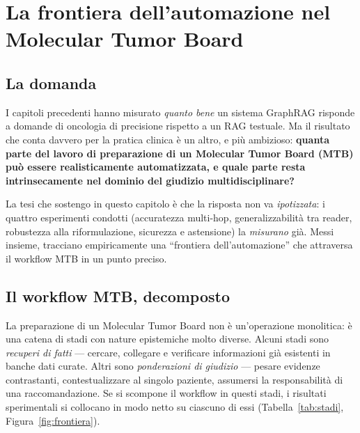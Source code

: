 \documentclass[11pt,a4paper]{report}
\begin{document}
\chapter{La frontiera dell'automazione nel Molecular Tumor Board}
\label{ch:frontiera-automazione}

\section{La domanda}

I capitoli precedenti hanno misurato \emph{quanto bene} un sistema GraphRAG
risponde a domande di oncologia di precisione rispetto a un RAG testuale. Ma
il risultato che conta davvero per la pratica clinica è un altro, e più
ambizioso: \textbf{quanta parte del lavoro di preparazione di un Molecular
Tumor Board (MTB) può essere realisticamente automatizzata, e quale parte
resta intrinsecamente nel dominio del giudizio multidisciplinare?}

La tesi che sostengo in questo capitolo è che la risposta non va
\emph{ipotizzata}: i quattro esperimenti condotti (accuratezza multi-hop,
generalizzabilità tra reader, robustezza alla riformulazione, sicurezza e
astensione) la \emph{misurano} già. Messi insieme, tracciano
empiricamente una ``frontiera dell'automazione'' che attraversa il workflow
MTB in un punto preciso.

\section{Il workflow MTB, decomposto}

La preparazione di un Molecular Tumor Board non è un'operazione monolitica:
è una catena di stadi con nature epistemiche molto diverse. Alcuni stadi
sono \emph{recuperi di fatti} --- cercare, collegare e verificare
informazioni già esistenti in banche dati curate. Altri sono
\emph{ponderazioni di giudizio} --- pesare evidenze contrastanti,
contestualizzare al singolo paziente, assumersi la responsabilità di una
raccomandazione. Se si scompone il workflow in questi stadi, i risultati
sperimentali si collocano in modo netto su ciascuno di essi
(Tabella~\ref{tab:stadi}, Figura~\ref{fig:frontiera}).
\end{document}
